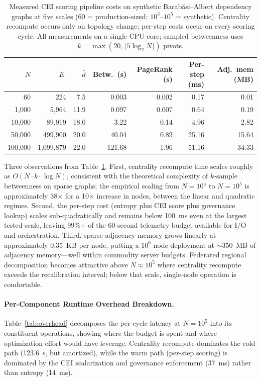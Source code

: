 \documentclass[runningheads]{llncs}
\begin{document}
\begin{table}[ht]
\caption{Measured CEI scoring pipeline costs on synthetic Barab\'{a}si--Albert dependency graphs at five scales (60 = production-sized; $10^3$--$10^5$ = synthetic). Centrality recompute occurs only on topology change; per-step costs occur on every scoring cycle. All measurements on a single CPU core; sampled betweenness uses $k = \max(20, \lfloor 5 \log_2 N \rfloor)$ pivots.}
\label{tab:scaling}
\centering
\footnotesize
\setlength{\tabcolsep}{5pt}
\begin{tabular}{rrrrrrr}
\toprule
$N$ & $|E|$ & $\bar{d}$ & Betw.\ (s) & PageRank (s) & Per-step (ms) & Adj.\ mem (MB) \\
\midrule
        60 &        224 &  7.5 &   0.003 & 0.002 &  0.17 &   0.01 \\
     1{,}000 &     5{,}964 & 11.9 &   0.097 & 0.007 &  0.64 &   0.19 \\
    10{,}000 &    89{,}919 & 18.0 &   3.22  & 0.14  &  4.96 &   2.82 \\
    50{,}000 &   499{,}900 & 20.0 &  40.04  & 0.89  & 25.16 &  15.64 \\
   100{,}000 & 1{,}099{,}879 & 22.0 & 121.68  & 1.96  & 51.16 &  34.33 \\
\bottomrule
\end{tabular}
\end{table}

Three observations from Table~\ref{tab:scaling}. First, centrality recompute time scales roughly as $O(N \cdot k \cdot \log N)$, consistent with the theoretical complexity of $k$-sample betweenness on sparse graphs; the empirical scaling from $N = 10^4$ to $N = 10^5$ is approximately 38$\times$ for a 10$\times$ increase in nodes, between the linear and quadratic regimes. Second, the per-step cost (entropy plus CEI score plus governance lookup) scales sub-quadratically and remains below 100~ms even at the largest tested scale, leaving 99\%+ of the 60-second telemetry budget available for I/O and orchestration. Third, sparse-adjacency memory grows linearly at approximately 0.35~KB per node, putting a $10^6$-node deployment at $\sim$350~MB of adjacency memory---well within commodity server budgets. Federated regional decomposition becomes attractive above $N \approx 10^5$ where centrality recompute exceeds the recalibration interval; below that scale, single-node operation is comfortable.

\paragraph{Per-Component Runtime Overhead Breakdown.}
Table~\ref{tab:overhead} decomposes the per-cycle latency at $N = 10^5$ into its constituent operations, showing where the budget is spent and where optimization effort would have leverage. Centrality recompute dominates the cold path (123.6~s, but amortized), while the warm path (per-step scoring) is dominated by the CEI scalarization and governance enforcement (37~ms) rather than entropy (14~ms).
\end{document}
